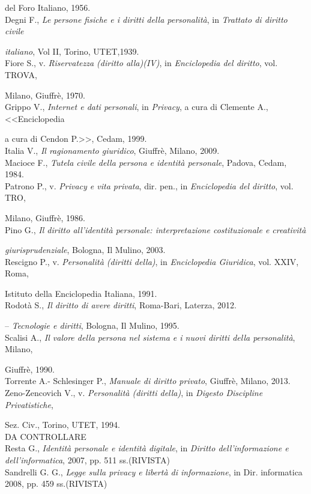 del Foro Italiano, 1956.
\\Degni F., \textit{Le persone fisiche e i diritti della personalità}, in \textit{Trattato di diritto civile}

\textit{italiano}, Vol II, Torino, UTET,1939.
\\Fiore S., v. \textit{Riservatezza (diritto alla)(IV)}, in \textit{Enciclopedia del diritto}, vol. TROVA,

Milano, Giuffrè, 1970. 
\\Grippo V., \textit{Internet e dati personali}, in \textit{Privacy}, a cura di Clemente A., <<Enciclopedia

a cura di Cendon P.>>, Cedam, 1999.
\\Italia V., \textit{Il ragionamento giuridico}, Giuffrè, Milano, 2009.
\\Macioce F., \textit{Tutela civile della persona e identità personale}, Padova, Cedam, 1984.
\\Patrono P., v. \textit{Privacy e vita privata}, dir. pen., in \textit{Enciclopedia del diritto}, vol. TRO,

Milano, Giuffrè, 1986.
\\Pino G., \textit{Il diritto all'identità personale: interpretazione costituzionale e creatività} 

\textit{giurisprudenziale}, Bologna, Il Mulino, 2003.
\\Rescigno P., v. \textit{Personalità (diritti della)}, in \textit{Enciclopedia Giuridica}, vol. XXIV, Roma,

Istituto della Enciclopedia Italiana, 1991.
\\Rodotà S., \textit{Il diritto di avere diritti}, Roma-Bari, Laterza, 2012. 

-- \textit{Tecnologie e diritti}, Bologna, Il Mulino, 1995.
\\Scalisi A., \textit{Il valore della persona nel sistema e i nuovi diritti della personalità}, Milano,

Giuffrè, 1990.
\\Torrente A.- Schlesinger P., \textit{Manuale di diritto privato}, Giuffrè, Milano, 2013.  
\\Zeno-Zencovich V., v. \textit{Personalità (diritti della)}, in \textit{Digesto Discipline Privatistiche},

Sez. Civ., Torino, UTET, 1994.
\\DA CONTROLLARE
\\Resta G., \textit{Identità personale e identità digitale}, in \textit{Diritto dell'informazione e dell'informatica}, 2007, pp. 511 ss.(RIVISTA)
\\Sandrelli G. G., \textit{Legge sulla privacy e libertà di informazione}, in Dir. informatica 2008, pp. 459 ss.(RIVISTA)
